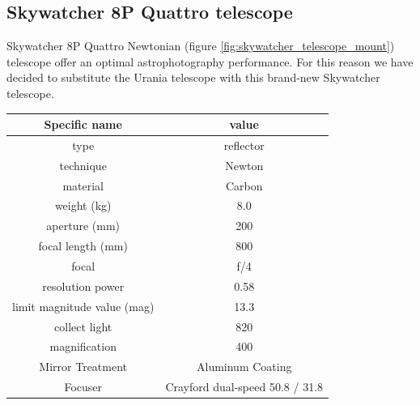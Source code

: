\documentclass{article}
\begin{document}
\begin{multicols}{2}
\begin{minipage}{0.5\textwidth}
            \label{fig:urania_telescope_mount}
        \end{minipage}

        \subsection{Skywatcher 8P Quattro telescope}
        Skywatcher 8P Quattro Newtonian (figure \ref{fig:skywatcher_telescope_mount}) telescope offer an optimal astrophotography performance.
        For this reason we have decided to substitute the Urania telescope with this brand-new Skywatcher telescope.
        \\
        \begin{minipage}{0.5\textwidth}
            \centering
            \begin{tabular}{c|c}
                Specific name & value \\
                \hline
                type & reflector \\
                technique & Newton  \\
                material & Carbon  \\
                weight (kg) & 8.0 \\
                aperture (mm) & 200 \\
                focal length (mm) & 800 \\
                focal & f/4 \\
                resolution power & 0.58 \\
                limit magnitude value (mag) & 13.3 \\
                collect light & 820 \\
                magnification & 400 \\
                Mirror Treatment & Aluminum Coating \\
                Focuser & Crayford dual-speed 50.8 / 31.8 \\
                \hline
            \end{tabular}
        \end{minipage}
        \\
        \\
        \begin{minipage}{0.5\textwidth}
            \centering

\end{minipage}
\end{multicols}
\end{document}

